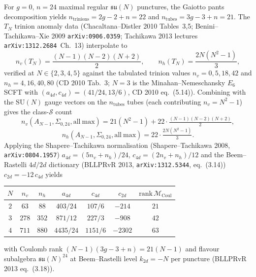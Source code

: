 \begin{proposition}
\label{prop:thqg-occ-CD-ANm1-24}
\ClaimStatusProvedHere
For $g = 0$, $n = 24$ maximal regular $\mathfrak{su}(N)$ punctures,
the Gaiotto pants decomposition yields
$n_{\mathrm{trinions}} = 2g - 2 + n = 22$ and
$n_{\mathrm{tubes}} = 3g - 3 + n = 21$. The $T_N$ trinion anomaly
data (Chacaltana--Distler 2010 Tables~3,5; Benini--Tachikawa--Xie
2009 \texttt{arXiv:0906.0359}; Tachikawa 2013 lectures
\texttt{arXiv:1312.2684}~Ch.\ 13) interpolate to
\[
 n_v(T_N) = \frac{(N-1)(N-2)(N+2)}{2},
 \qquad
 n_h(T_N) = \frac{2N(N^2 - 1)}{3},
\]
verified at $N \in \{2, 3, 4, 5\}$ against the tabulated trinion
values $n_v = 0, 5, 18, 42$ and $n_h = 4, 16, 40, 80$ (CD 2010
Tab.\ 3; $N = 3$ is the Minahan--Nemeschansky $E_6$ SCFT with
$(a_{4d}, c_{4d}) = (41/24, 13/6)$, CD 2010 eq.\ (5.14)). Combining
with the $\mathrm{SU}(N)$ gauge vectors on the $n_{\mathrm{tubes}}$
tubes (each contributing $n_v = N^2 - 1$) gives the class-$\mathcal S$
count
\[
 n_v(A_{N-1}, \Sigma_{0,24}, \mathrm{all\ max})
 = 21(N^2 - 1) + 22\cdot\tfrac{(N-1)(N-2)(N+2)}{2},
\]
\[
 n_h(A_{N-1}, \Sigma_{0,24}, \mathrm{all\ max})
 = 22\cdot\tfrac{2N(N^2 - 1)}{3}.
\]
Applying the Shapere--Tachikawa normalisation (Shapere--Tachikawa
2008, \texttt{arXiv:0804.1957}) $a_{4d} = (5n_v + n_h)/24$,
$c_{4d} = (2n_v + n_h)/12$ and the Beem--Rastelli $4d/2d$
dictionary (BLLPRvR 2013, \texttt{arXiv:1312.5344}, eq.~(3.14))
$c_{2d} = -12\,c_{4d}$ yields
\begin{center}
\begin{tabular}{|c|c|c|c|c|c|c|}
\hline
$N$ & $n_v$ & $n_h$ & $a_{4d}$ & $c_{4d}$ & $c_{2d}$ &
 $\mathrm{rank}\,\mathcal M_{\mathrm{Coul}}$ \\
\hline
$2$ & $63$ & $88$ & $403/24$ & $107/6$ & $-214$ & $21$ \\
$3$ & $278$ & $352$ & $871/12$ & $227/3$ & $-908$ & $42$ \\
$4$ & $711$ & $880$ & $4435/24$ & $1151/6$ & $-2302$ & $63$ \\
\hline
\end{tabular}
\end{center}
with Coulomb rank $(N-1)(3g - 3 + n) = 21(N-1)$ and flavour
subalgebra $\mathfrak{su}(N)^{24}$ at Beem--Rastelli level
$k_{2d} = -N$ per puncture (BLLPRvR 2013 eq.~(3.18)).
\end{proposition}

